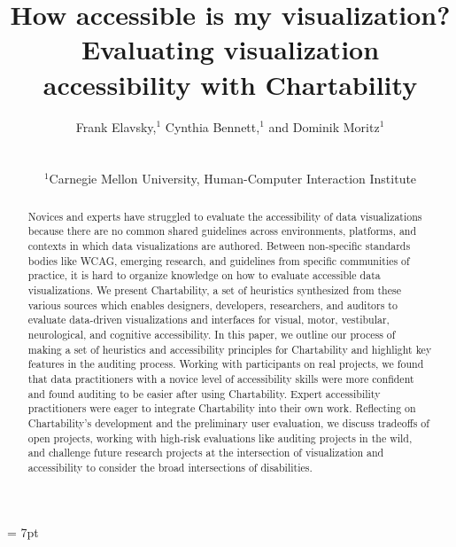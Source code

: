\documentclass{egpubl}
\title[Chartability]%
      {How accessible is my visualization? Evaluating visualization accessibility with Chartability}
\author[F. Elavsky, C. Bennett, \& D. Moritz]
{\parbox{\textwidth}{\centering Frank Elavsky,$^{1}$\orcid{0000-0002-6849-5893}
        Cynthia Bennett,$^{1}$
        and Dominik Moritz$^{1}$\orcid{0000-0002-3110-1053}
        }
        \\
{\parbox{\textwidth}{\centering $^1$Carnegie Mellon University, Human-Computer Interaction Institute\\
       } 
}
}
\begin{document}
\tabcolsep = 7pt
\def\arraystretch{1.3}


\maketitle
\begin{abstract}
Novices and experts have struggled to evaluate the accessibility of data visualizations because there are no common shared guidelines across environments, platforms, and contexts in which data visualizations are authored. Between non-specific standards bodies like WCAG, emerging research, and guidelines from specific communities of practice, it is hard to organize knowledge on how to evaluate accessible data visualizations. We present Chartability, a set of heuristics synthesized from these various sources which enables designers, developers, researchers, and auditors to evaluate data-driven visualizations and interfaces for visual, motor, vestibular, neurological, and cognitive accessibility. In this paper, we outline our process of making a set of heuristics and accessibility principles for Chartability and highlight key features in the auditing process. Working with participants on real projects, we found that data practitioners with a novice level of accessibility skills were more confident and found auditing to be easier after using Chartability. Expert accessibility practitioners were eager to integrate Chartability into their own work. Reflecting on Chartability’s development and the preliminary user evaluation, we discuss tradeoffs of open projects, working with high-risk evaluations like auditing projects in the wild, and challenge future research projects at the intersection of visualization and accessibility to consider the broad intersections of disabilities.


\end{abstract}
\end{document}
